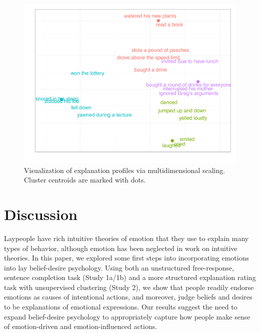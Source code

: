 \documentclass[10pt,letterpaper]{article}
\begin{document}
\begin{figure}[htb!]
\begin{center}\includegraphics[width=1\columnwidth]{images/study2MDS.pdf}\end{center}
\caption{ Visualization of explanation profiles via multidimensional scaling. Cluster centroids are marked with dots.}
\label{Study2MDSFig}
\end{figure}


\section{Discussion}

Laypeople have rich intuitive theories of emotion that they use to explain many types of behavior, although emotion has been neglected in work on intuitive theories. In this paper, we explored some first steps into incorporating emotions into lay belief-desire psychology. Using both an unstructured free-response, sentence completion task (Study 1a/1b) and a more structured explanation rating task with unsupervised clustering (Study 2), we show that people readily endorse emotions as causes of intentional actions, and moreover, judge beliefs and desires to be explanations of emotional expressions. Our results suggest the need to expand belief-desire psychology to appropriately capture how people make sense of emotion-driven and emotion-influenced actions.
\end{document}
